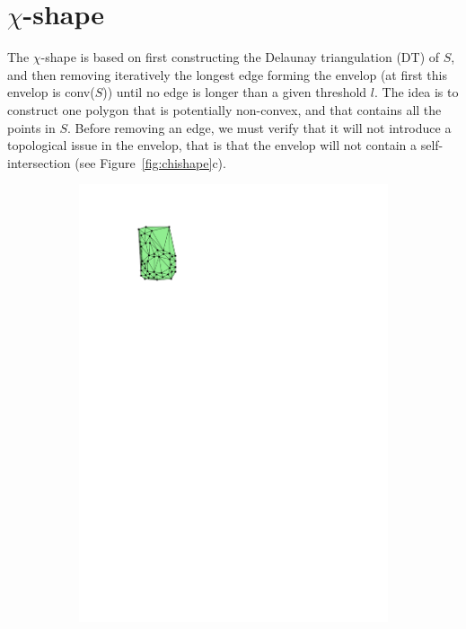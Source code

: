 %
\section{$\chi$-shape}

The $\chi$-shape is based on first constructing the Delaunay triangulation (DT) of $S$, and then removing iteratively the longest edge forming the envelop (at first this envelop is conv($S$)) until no edge is longer than a given threshold $l$.
The idea is to construct one polygon that is potentially non-convex, and that contains all the points in $S$.
Before removing an edge, we must verify that it will not introduce a topological issue in the envelop, that is that the envelop will not contain a self-intersection (see Figure~\ref{fig:chishape}c).
\begin{figure}
  \centering
  \begin{subfigure}[b]{0.3\linewidth}
    \centering
    \includegraphics[page=1,width=\textwidth]{figs/chishape.pdf}

\end{subfigure}
\end{figure}
